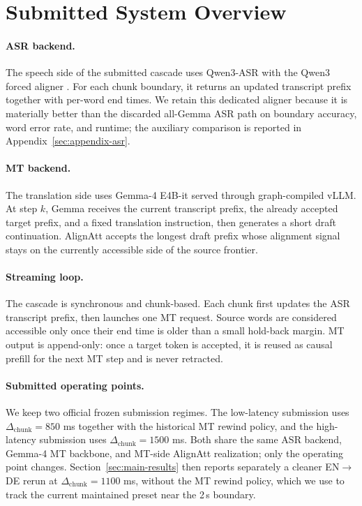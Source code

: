 \documentclass[11pt]{article}
\begin{document}


\section{Submitted System Overview}
\label{sec:system}

\paragraph{ASR backend.}
The speech side of the submitted cascade uses Qwen3-ASR with the Qwen3 forced
aligner \citep{qwen3asr25}. For each chunk boundary, it returns an updated
transcript prefix together with per-word end times. We retain this dedicated
aligner because it is materially better than the discarded all-Gemma ASR path
on boundary accuracy, word error rate, and runtime; the auxiliary comparison is
reported in Appendix~\ref{sec:appendix-asr}.

\paragraph{MT backend.}
The translation side uses Gemma-4 E4B-it served through graph-compiled vLLM.
At step $k$, Gemma receives the current transcript prefix, the already accepted
target prefix, and a fixed translation instruction, then generates a short
draft continuation. AlignAtt accepts the longest draft prefix whose alignment
signal stays on the currently accessible side of the source frontier.

\paragraph{Streaming loop.}
The cascade is synchronous and chunk-based. Each chunk first updates the ASR
transcript prefix, then launches one MT request. Source words are considered
accessible only once their end time is older than a small hold-back margin. MT
output is append-only: once a target token is accepted, it is reused as causal
prefill for the next MT step and is never retracted.

\paragraph{Submitted operating points.}
We keep two official frozen submission regimes. The low-latency submission
uses $\Delta_{\mathrm{chunk}}=850$ ms together with the historical MT rewind
policy, and the high-latency submission uses $\Delta_{\mathrm{chunk}}=1500$ ms.
Both share the same ASR backend, Gemma-4 MT backbone, and MT-side AlignAtt
realization; only the operating point changes. Section~\ref{sec:main-results}
then reports separately a cleaner EN$\to$DE rerun at $\Delta_{\mathrm{chunk}}
=1100$ ms, without the MT rewind policy, which we use to track the current
maintained preset near the 2\,s boundary.
\end{document}
